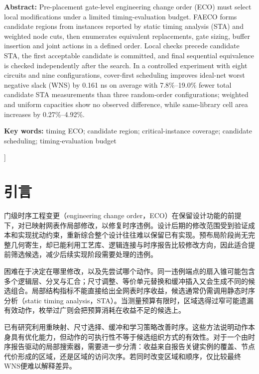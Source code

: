 \documentclass[twocolumn,10pt,fontset=windows]{ctexart}
\begin{document}
\begin{flushleft}
  {\bfseries Abstract:} {\small Pre-placement gate-level engineering change order (ECO) must select local modifications under a limited timing-evaluation budget. FAECO forms candidate regions from instances reported by static timing analysis (STA) and weighted node cuts, then enumerates equivalent replacements, gate sizing, buffer insertion and joint actions in a defined order. Local checks precede candidate STA, the first acceptable candidate is committed, and final sequential equivalence is checked independently after the search. In a controlled experiment with eight circuits and nine configurations, cover-first scheduling improves ideal-net worst negative slack (WNS) by 0.161 ns on average with 7.8\%--19.0\% fewer total candidate STA measurements than three random-order configurations; weighted and uniform capacities show no observed difference, while same-library cell area increases by 0.27\%--4.92\%.}\par
\vspace{3pt}
{\bfseries Key words:} {\small timing ECO; candidate region; critical-instance coverage; candidate scheduling; timing-evaluation budget}\par
\end{flushleft}
]%




\section{引言}

门级时序工程变更（engineering change order，ECO）在保留设计功能的前提下，对已映射网表作局部修改，以修复时序违例。设计后期的修改范围受到验证成本和实现扰动约束，重新综合整个设计往往难以保留已有实现。预布局阶段尚无完整几何寄生，却已能利用工艺库、逻辑连接与时序报告比较修改方向，因此适合提前筛选候选，减少后续实现阶段需要处理的违例。

困难在于决定在哪里修改，以及先尝试哪个动作。同一违例端点的扇入锥可能包含多个逻辑层、分叉与汇合；尺寸调整、等价单元替换和缓冲插入又会生成不同的候选组合。局部结构指标不能直接给出全网表时序收益，候选通常仍需调用静态时序分析（static timing analysis，STA）。当测量预算有限时，区域选得过窄可能遗漏有效动作，枚举过广则会把预算消耗在收益不足的候选上。

已有研究利用重映射、尺寸选择、缓冲和学习策略改善时序\cite{ho2010eco,liu2021rlsizer,chen2024aito}。这些方法说明动作本身具有优化能力，但动作的可执行性不等于候选组织方式的有效性。对于一个由时序报告驱动的局部搜索器，需要进一步分清：收益来自报告关键实例的覆盖、节点代价形成的区域，还是区域的访问次序。若同时改变区域和顺序，仅比较最终WNS便难以解释差异。
\end{document}
